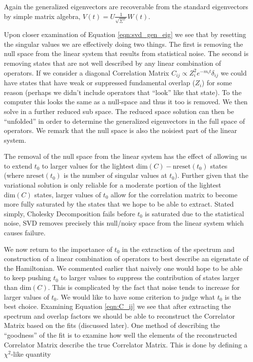 Again the generalized eigenvectors are recoverable from the standard eigenvectors by simple matrix algebra, $V(t) = U\frac{1}{\sqrt{\Sigma^{+}}}W(t)$.
\par
Upon closer examination of Equation \ref{eqn:svd_gen_eig} we see that by resetting the singular values we are effectively doing two things.  The first is removing the null space from the linear system that results from statistical noise.  The second is removing states that are not well described by any linear combination of operators.  If we consider a diagonal Correlation Matrix $C_{ij} \propto Z_i^2e^{-m_it}\delta_{ij}$ we could have states that have weak or suppressed fundamental overlap ($Z_i$) for some reason (perhaps we didn't include operators that ``look'' like that state).  To the computer this looks the same as a null-space and thus it too is removed.  We then solve in a further reduced sub space. The reduced space solution can then be ``unfolded'' in order to determine the generalized eigenvectors in the full space of operators. We remark that the null space is also the noisiest part of the linear system. 
\par
The removal of the null space from the linear system has the effect of allowing us to extend $t_0$ to larger values for the lightest $\mathrm{dim}(C) - \mathrm{nreset}(t_0)$ states (where $\mathrm{nreset}(t_0)$ is the number of singular values at $t_0$). Further given that the variational solution is only reliable for a moderate portion of the lightest $\mathrm{dim}(C)$ states, larger values of $t_0$ allow for the correlation matrix to become more fully saturated by the states that we hope to be able to extract.  Stated simply, Cholesky Decomposition fails before $t_0$ is saturated due to the statistical noise, SVD removes precisely this null/noisy space from the linear system which causes failure.
\par
We now return to the importance of $t_0$ in the extraction of the spectrum and construction of a linear combination of operators to best describe an eigenstate of the Hamiltonian. We commented earlier that naively one would hope to be able to keep pushing $t_0$ to larger values to suppress the contribution of states larger than $\mathrm{dim}(C)$.  This is complicated by the fact that noise tends to increase for larger values of $t_0$.  We would like to have some criterion to judge what $t_0$ is the best choice. Examining Equation \ref{eqn:C_ij} we see that after extracting the spectrum and overlap factors we should be able to reconstruct the Correlator Matrix based on the fits (discussed later). One method of describing the ``goodness'' of the fit is to examine how well the elements of the reconstructed Correlator Matrix describe the true Correlator Matrix.  This is done by defining a $\chi^2$-like quantity \cite{dudek08}

